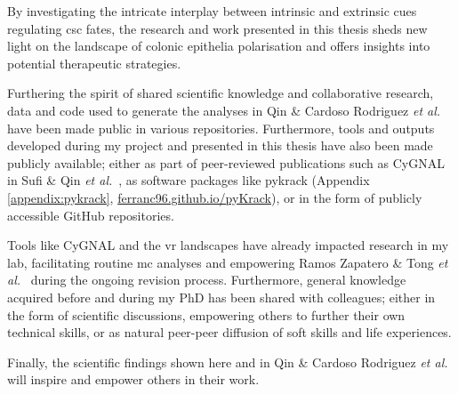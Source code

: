 \begin{impactstatement}


By investigating the intricate interplay between intrinsic and extrinsic cues regulating \acrshort{csc} fates, the research and work presented in this thesis sheds new light on the landscape of colonic epithelia polarisation and offers insights into potential therapeutic strategies. 

Furthering the spirit of shared scientific knowledge and collaborative research, data and code used to generate the analyses in Qin \& Cardoso Rodriguez \emph{et al.} have been made public in various repositories. Furthermore, tools and outputs developed during my project and presented in this thesis have also been made publicly available; either as part of peer-reviewed publications such as CyGNAL in Sufi \& Qin \emph{et al.}~\cite{sufi_multiplexed_2021}, as software packages like pykrack (Appendix \ref{appendix:pykrack}, \url{ferranc96.github.io/pyKrack}), or in the form of publicly accessible GitHub repositories. 

Tools like CyGNAL and the \acrshort{vr} landscapes have already impacted research in my lab, facilitating routine \acrshort{mc} analyses and empowering Ramos Zapatero \& Tong \emph{et al.}~\cite{zapatero_trellis_2023} during the ongoing revision process. Furthermore, general knowledge acquired before and during my PhD has been shared with colleagues; either in the form of scientific discussions, empowering others to further their own technical skills, or as natural peer-peer diffusion of soft skills and life experiences.

Finally, the scientific findings shown here and in Qin \& Cardoso Rodriguez \emph{et al.}~\cite{cardoso_rodriguez_single-cell_2023} will inspire and empower others in their work.



\end{impactstatement}
